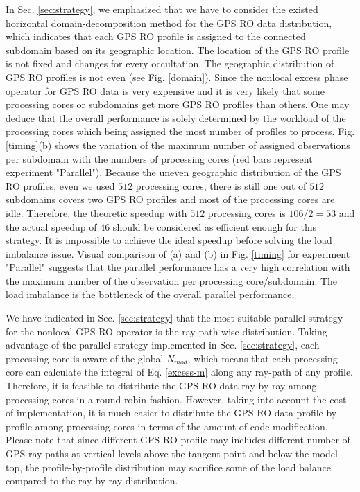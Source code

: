 \documentclass[12pt]{article}
\begin{document}
In Sec. \ref{sec:strategy}, we emphasized that we have to consider the existed horizontal domain-decomposition method for the GPS RO data distribution, which indicates that each GPS RO profile is assigned to the connected subdomain based on its geographic location. The location of the GPS RO profile is not fixed and changes for every occultation. The geographic distribution of GPS RO profiles is not even  (see Fig. \ref{domain}). Since the nonlocal excess phase operator for GPS RO data is very expensive and it is very likely that some processing cores or subdomains get more GPS RO profiles than others. One may deduce that the overall performance is solely determined by the workload of the processing cores which being assigned the most number of profiles to process. Fig. \ref{timing}(b) shows the variation of the maximum number of assigned observations per subdomain with the numbers of processing cores (red bars represent experiment "Parallel"). Because the uneven geographic distribution of the GPS RO profiles, even we used $512$ processing cores, there is still one out of $512$ subdomains covers two GPS RO profiles and most of the processing cores are idle. Therefore, the theoretic speedup with $512$ processing cores is $106/2=53$ and the actual speedup of $46$ should be considered as efficient enough for this strategy. It is impossible to achieve the ideal speedup before solving the load imbalance issue. Visual comparison of (a) and (b) in Fig. \ref{timing} for experiment "Parallel" suggests that the parallel performance has a very high correlation with the maximum number of the observation per processing core/subdomain. The load imbalance is the bottleneck of the overall parallel performance.

We have indicated in Sec. \ref{sec:strategy} that the most suitable parallel strategy for the nonlocal GPS RO operator is the ray-path-wise distribution. Taking advantage of the parallel strategy implemented in Sec. \ref{sec:strategy}, each processing core is aware of the global $N_{mod}$, which means that each processing core can calculate the integral of Eq. \ref{excess-m} along any ray-path of any profile. Therefore, it is feasible to distribute the GPS RO data ray-by-ray among processing cores in a round-robin fashion. However, taking into account the cost of implementation, it is much easier to distribute the GPS RO data profile-by-profile among processing cores in terms of the amount of code modification. Please note that since different GPS RO profile may includes different number of GPS ray-paths at vertical levels above the tangent point and below the model top, the profile-by-profile distribution may sacrifice some of the load balance compared to the ray-by-ray distribution. 
\end{document}
